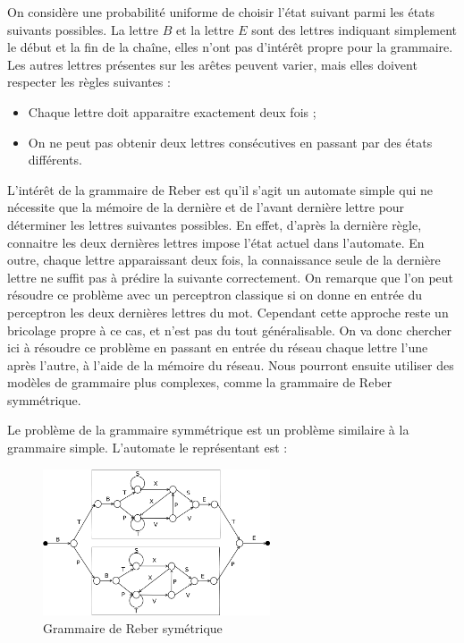 On considère une probabilité uniforme de choisir l'état suivant parmi les états suivants possibles.
La lettre $B$ et la lettre $E$ sont des lettres indiquant simplement le début et la fin de la chaîne, elles n'ont pas d'intérêt propre pour la grammaire.
Les autres lettres présentes sur les arêtes peuvent varier, mais elles doivent respecter les règles suivantes :

\medskip

\begin{itemize}
	\item Chaque lettre doit apparaitre exactement deux fois ;
	\item On ne peut pas obtenir deux lettres consécutives en passant par des états différents.
\end{itemize}

\medskip

L'intérêt de la grammaire de Reber est qu'il s'agit un automate simple qui ne nécessite que la mémoire de la dernière et de l'avant dernière lettre pour déterminer les lettres suivantes possibles.
En effet, d'après la dernière règle, connaitre les deux dernières lettres impose l'état actuel dans l'automate.
En outre, chaque lettre apparaissant deux fois, la connaissance seule de la dernière lettre ne suffit pas à prédire la suivante correctement.
On remarque que l'on peut résoudre ce problème avec un perceptron classique si on donne en entrée du perceptron les deux dernières lettres du mot. Cependant cette approche reste un bricolage propre à ce cas, et n'est pas du tout généralisable. On va donc chercher ici à résoudre ce problème en passant en entrée du réseau chaque lettre l'une après l'autre, à l'aide de la mémoire du réseau. Nous pourront ensuite utiliser des modèles de grammaire plus complexes, comme la grammaire de Reber symmétrique.

\medskip

Le problème de la grammaire symmétrique est un problème similaire à la grammaire simple. L'automate le représentant est :

\begin{figure}[!ht]
\begin{center}
\includegraphics[width=0.6\textwidth]{images/reberGrammarSymmetric.png}
\end{center}
\caption{Grammaire de Reber symétrique}
\end{figure}


